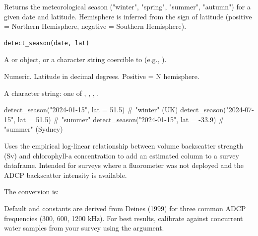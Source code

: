 \documentclass[a4paper]{book}
\begin{document}
%
\begin{Description}
Returns the meteorological season ("winter", "spring", "summer", "autumn")
for a given date and latitude. Hemisphere is inferred from the sign of
latitude (positive = Northern Hemisphere, negative = Southern Hemisphere).
\end{Description}
%
\begin{Usage}
\begin{verbatim}
detect_season(date, lat)
\end{verbatim}
\end{Usage}
%
\begin{Arguments}
\begin{ldescription}
\item[\code{date}] A  or  object, or a character string coercible
to  (e.g., ).

\item[\code{lat}] Numeric. Latitude in decimal degrees. Positive = N hemisphere.
\end{ldescription}
\end{Arguments}
%
\begin{Value}
A character string: one of , , ,
.
\end{Value}
%
\begin{Examples}
\begin{ExampleCode}
detect_season("2024-01-15", lat = 51.5)   # "winter" (UK)
detect_season("2024-07-15", lat = 51.5)   # "summer"
detect_season("2024-01-15", lat = -33.9)  # "summer" (Sydney)
\end{ExampleCode}
\end{Examples}
%
\begin{Description}
Uses the empirical log-linear relationship between volume backscatter
strength (Sv) and chlorophyll-a concentration to add an estimated
 column to a survey dataframe. Intended for surveys where
a fluorometer was not deployed and the ADCP backscatter intensity is
available.

The conversion is: 

Default  and  constants are derived from Deines (1999) for three
common ADCP frequencies (300, 600, 1200 kHz). For best results, calibrate
against concurrent water samples from your survey using the 
argument.
\end{Description}
\end{document}
